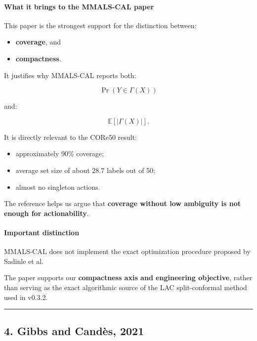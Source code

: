 \paragraph{What it brings to the MMALS-CAL paper}\label{what-it-brings-to-the-mmals-cal-paper-2}

This paper is the strongest support for the distinction between:

\begin{itemize}
\tightlist
\item
  \textbf{coverage}, and
\item
  \textbf{compactness}.
\end{itemize}

It justifies why MMALS-CAL reports both:

\[
\Pr(Y\in\Gamma(X))
\]

and:

\[
\mathbb E[|\Gamma(X)|].
\]

It is directly relevant to the CORe50 result:

\begin{itemize}
\tightlist
\item
  approximately 90\% coverage;
\item
  average set size of about 28.7 labels out of 50;
\item
  almost no singleton actions.
\end{itemize}

The reference helps us argue that \textbf{coverage without low ambiguity is not enough for actionability}.

\paragraph{Important distinction}\label{important-distinction}

MMALS-CAL does not implement the exact optimization procedure proposed by Sadinle et al.

The paper supports our \textbf{compactness axis and engineering objective}, rather than serving as the exact algorithmic source of the LAC split-conformal method used in v0.3.2.

\begin{center}\rule{0.5\linewidth}{0.5pt}\end{center}

\subsection{4. Gibbs and Candès, 2021}\label{gibbs-and-canduxe8s-2021}

